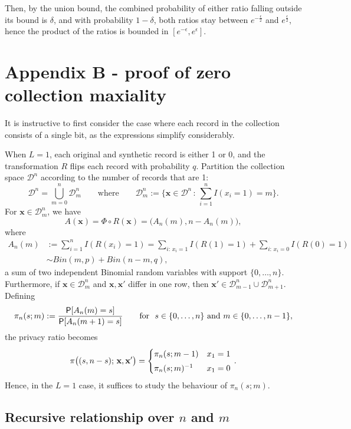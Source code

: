 \documentclass[11pt]{article}
\newcommand{\Dsp}{\mathcal{D}}
\newcommand{\xv}{\mathbf{x}}
\begin{document}
Then, by the union bound, the combined probability of either ratio falling outside its bound is $\delta$, and with probability $1-\delta$, both ratios stay between $e^{-\frac{\epsilon}{2}}$ and $e^\frac{\epsilon}{2}$, hence the product of the ratios is bounded in $[ e^{-\epsilon}, e^\epsilon]$.   

\begin{prop}
\end{prop}



\section{Appendix B - proof of zero collection maxiality}

It is instructive to first consider the case where each record in the collection consists of a single bit, as the expressions simplify considerably.

When $L=1$, each original and synthetic record is either 1 or 0, and the transformation $R$ flips each record with probability $q$.
Partition the collection space $\Dsp^n$ according to the number of records that are 1:
\[ \Dsp^n = \bigcup_{m = 0}^n \Dsp_m^n
\quad\quad\text{where}\quad\quad
\Dsp_m^n := \bigg\{ \xv\in\Dsp^n \,:\, \sum_{i=1}^n I(x_i = 1) = m \bigg\}.
\]
For $\xv\in\Dsp_m^n$, we have
\[ A(\xv) = \Phi\circ R(\xv) = \big(A_n(m), n - A_n(m)\big), \]
where
\begin{align*}
A_n(m) &:= \sum_{i=1}^n I(R(x_i) = 1)
= \sum_{i:\, x_i = 1} I(R(1) = 1) + \sum_{i:\, x_i = 0} I(R(0) = 1) \\
&\sim Bin(m, p) + Bin(n-m, q),
\end{align*}
a sum of two independent Binomial random variables with support $\{0,\dots,n\}$.
Furthermore, if $\xv\in\Dsp_m^n$ and $\xv,\xv'$ differ in one row, then $\xv'\in\Dsp_{m-1}^n \cup \Dsp_{m+1}^n$.
Defining
\[ \pi_n(s; m) := \frac{\P[A_n(m) = s]}{\P[A_n(m+1) = s]}
\quad\quad\text{for}\ \ 
s\in\{0,\dots,n\}\ \text{and}\ m\in\{0,\dots,n-1\},
\]
the privacy ratio becomes
\[ \pi\big((s, n-s);\,\xv,\xv'\big) =
\begin{cases}
\pi_n(s;m - 1) & x_1 = 1 \\[0.3em]
\inv{\pi_n(s;m)} & x_1 = 0
\end{cases}\, .
\]
Hence, in the $L=1$ case, it suffices to study the behaviour of $\pi_n(s;m)$.


\subsection{Recursive relationship over $n$ and $m$}
\end{document}
